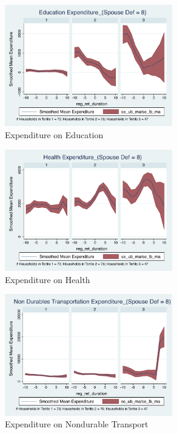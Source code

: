 \documentclass[11pt,onecolumn]{article}
\numberwithin{figure}{section}
\begin{document}
\begin{figure}[h]
	\caption{Expenditure on Education}
	\centering
	\includegraphics[width=0.65\textwidth]{../ConsumptionPostRetirement_by_SpouseDef_Cats/Smoothed/8/spouse_def_total_education_real.pdf}
\end{figure}
\clearpage

\begin{figure}[h]
	\caption{Expenditure on Health}
	\centering
	\includegraphics[width=0.65\textwidth]{../ConsumptionPostRetirement_by_SpouseDef_Cats/Smoothed/8/spouse_def_total_healthexpense_real.pdf}
\end{figure}

\begin{figure}[h]
	\caption{Expenditure on Nondurable Transport}
	\centering
	\includegraphics[width=0.65\textwidth]{../ConsumptionPostRetirement_by_SpouseDef_Cats/Smoothed/8/spouse_def_total_transport_real.pdf}
\end{figure}
\end{document}

